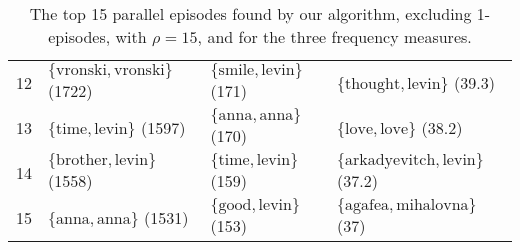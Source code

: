 \begin{table}
\begin{tabulary}{\textwidth}{R|L|L|L}
12 & $ \{ \text{vronski},\allowbreak\text{vronski} \} $ (1722) & $ \{ \text{smile},\allowbreak\text{levin} \} $ (171) & $ \{ \text{thought},\allowbreak\text{levin} \} $ (39.3) \\
13 & $ \{ \text{time},\allowbreak\text{levin} \} $ (1597) & $ \{ \text{anna},\allowbreak\text{anna} \} $ (170) & $ \{ \text{love},\allowbreak\text{love} \} $ (38.2) \\
14 & $ \{ \text{brother},\allowbreak\text{levin} \} $ (1558) & $ \{ \text{time},\allowbreak\text{levin} \} $ (159) & $ \{ \text{arkadyevitch},\allowbreak\text{levin} \} $ (37.2) \\
15 & $ \{ \text{anna},\allowbreak\text{anna} \} $ (1531) & $ \{ \text{good},\allowbreak\text{levin} \} $ (153) & $ \{ \text{agafea},\allowbreak\text{mihalovna} \} $ (37) \\
\end{tabulary}%
\caption{The top 15 parallel episodes found by our algorithm, excluding 1-episodes, with $ \rho = 15 $, and for the three frequency measures.}
\label{table:fmw-tolstoy-top-15-parallel->1-episodes}
\end{table}

